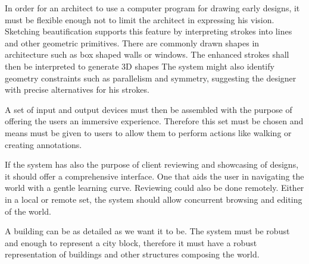 In order for an architect to use a computer program for drawing early designs,
it must be flexible enough not to limit the architect in expressing his vision.
Sketching beautification supports this feature by interpreting strokes
into lines and other geometric primitives.
There are commonly drawn shapes in architecture such as box shaped walls or windows.
The enhanced strokes shall then be interpreted to generate 3D shapes
The system might also identify geometry constraints such as parallelism and symmetry,
suggesting the designer with precise alternatives for his strokes.

A set of input and output devices must then be assembled with the purpose of offering
the users an immersive experience. Therefore this set must be chosen and
means must be given to users to allow them to perform actions like walking or creating
annotations.

If the system has also the purpose of client reviewing and showcasing of designs,
it should offer a comprehensive interface.
One that aids the user in navigating the world with a gentle learning curve.
Reviewing could also be done remotely.
Either in a local or remote set, the system should allow
concurrent browsing and editing of the world.

A building can be as detailed as we want it to be.
The system must be robust and enough to represent a city block, therefore it must have a
robust representation of buildings and other structures composing the world.

